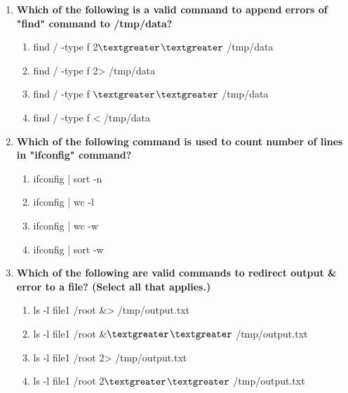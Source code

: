 \begin{flushleft}
\begin{enumerate}
		
		\item \textbf{Which of the following is a valid command to append errors of "find" command to \textbf{/tmp/data}?}
		\begin{enumerate}[label=(\alph*)]
			\item find / -type f 2{$\textgreater$}{$\textgreater$} /tmp/data   %
			\item find / -type f 2> /tmp/data   
			\item find / -type f {$\textgreater$}{$\textgreater$} /tmp/data   
			\item find / -type f < /tmp/data
		\end{enumerate}
		\bigskip
		\bigskip
		
		\item \textbf{Which of the following command is used to count number of lines in \textbf{"ifconfig"} command?}
		\begin{enumerate}[label=(\alph*)]
			\item ifconfig | sort -n
			\item ifconfig | wc -l         %
			\item ifconfig | wc -w 
			\item ifconfig | sort -w
		\end{enumerate}

		\bigskip
		\bigskip
		\item \textbf{Which of the following are valid commands to redirect output \& error to a file? (Select all that applies.)}
		\begin{enumerate}[label=(\alph*)]
			\item ls -l file1 /root  \&> /tmp/output.txt   %
			\item ls -l file1 /root  \&{$\textgreater$}{$\textgreater$} /tmp/output.txt %
			\item ls -l file1 /root  2> /tmp/output.txt
			\item ls -l file1 /root  2{$\textgreater$}{$\textgreater$} /tmp/output.txt
		\end{enumerate}
		
	\end{enumerate}
	
	
\end{flushleft}

\newpage

